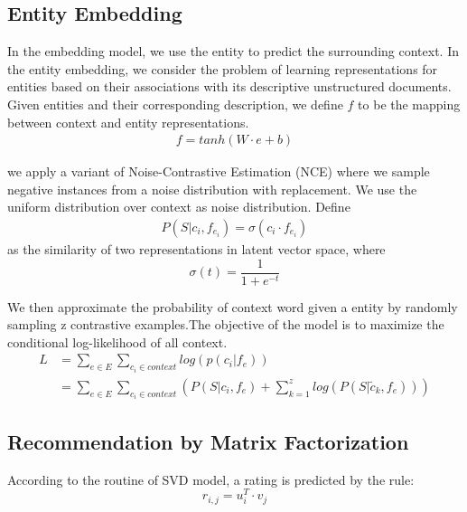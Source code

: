 \documentclass{template}
\begin{document}
\subsection{Entity Embedding}
In the embedding model, we use the entity to predict the surrounding context. In the entity embedding, we consider the problem of learning representations for entities based on their associations with its descriptive unstructured documents. Given entities and their corresponding description, we define $f$ to be the mapping between context and entity representations. 
\begin{equation}
\begin{aligned}
f = tanh(W\cdot e + b)
\end{aligned}
\end{equation}

we apply a variant of Noise-Contrastive Estimation (NCE) where we sample negative instances from a noise distribution with replacement. We use the uniform distribution over context as noise distribution. Define
\begin{equation}
\begin{aligned}
P(S|c_i, f_{e_i}) = \sigma(c_i \cdot f_{e_i})
\end{aligned}
\end{equation}
as the similarity of two representations in latent vector space, where
\begin{equation}
\sigma(t) = \frac{1}{1 + e^{-t}}
\end{equation}

We then approximate the probability of context word given a entity by randomly sampling z contrastive examples.The objective of the model is to maximize the conditional log-likelihood of all context.
\begin{equation}
\begin{aligned}
L &= \sum_{e\in E} \sum_{c_i\in context} log(p(c_i|f_e)) \\
&= \sum_{e\in E} \sum_{c_i\in context}(P(S|c_i, f_{e}) + \sum_{k=1}^z log(P(S|\tilde c_k, f_{e})))
\end{aligned}
\end{equation}


\subsection{Recommendation by Matrix Factorization}
According to the routine of SVD model, a rating is predicted by the rule:
\begin{equation}
\hat{r}_{i,j} = u_i^T \cdot v_j
\end{equation}
\end{document}
